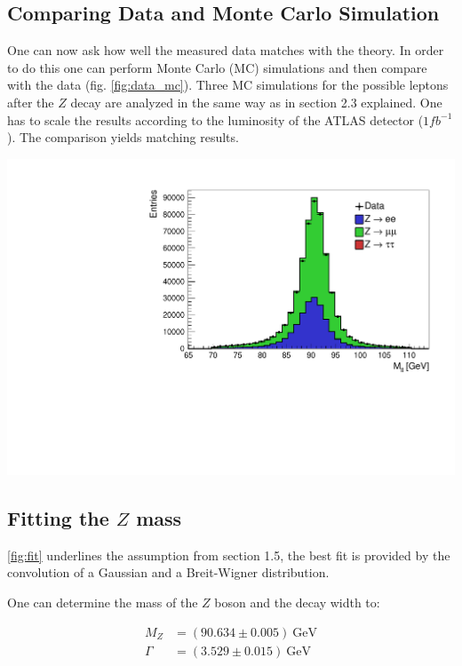\documentclass[12pt, a4paper, bibliography=totoc]{scrartcl}
\begin{document}
\begin{multicols}{2}
\subsection{Comparing Data and Monte Carlo Simulation}
One can now ask how well the measured data matches with the theory. 
In order to do this one can perform Monte Carlo (MC) simulations and then compare with the data (fig. \ref{fig:data_mc}). 
Three MC simulations for the possible leptons after the $Z$ decay are analyzed in the same way as in section 2.3 explained. One has to scale the results according to the luminosity of the ATLAS detector ($1 fb^{-1}$).
The comparison yields matching results.
\begin{center}
	\includegraphics[width=\linewidth]{fig/vergleich_data_mc_final.pdf}
	\label{fig:data_mc}
\end{center}


\subsection{Fitting the $Z$ mass}
\ref{fig:fit} underlines the assumption from section 1.5, the best fit is provided by the convolution of a Gaussian and a Breit-Wigner distribution. 

One can determine the mass of the $Z$ boson and the decay width to: 

\begin{align}
M_Z &= (90.634 \pm 0.005) \ \text{GeV}\\
\Gamma &= (3.529 \pm 0.015) \ \text{GeV}
\end{align}


\end{multicols}
\end{document}
